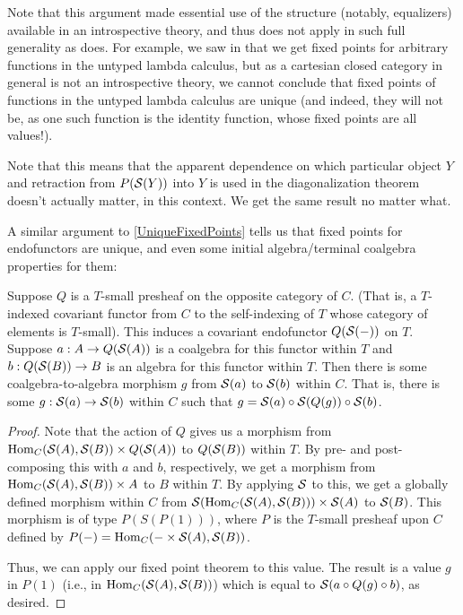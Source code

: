 \begin{observation}
Note that this argument made essential use of the structure (notably, equalizers) available in an introspective theory, and thus does not apply in such full generality as  does. For example, we saw in  that we get fixed points for arbitrary functions in the untyped lambda calculus, but as a cartesian closed category in general is not an introspective theory, we cannot conclude that fixed points of functions in the untyped lambda calculus are unique (and indeed, they will not be, as one such function is the identity function, whose fixed points are all values!).
\end{observation}

\begin{observation}
Note that this means that the apparent dependence on which particular object $Y$ and retraction from $P(\mathcal{S}(Y))$ into $Y$ is used in the diagonalization theorem doesn't actually matter, in this context. We get the same result no matter what.
\end{observation}

A similar argument to \cref{UniqueFixedPoints} tells us that fixed points for endofunctors are unique, and even some initial algebra/terminal coalgebra properties for them: \TODO

\begin{theorem}\label{CoalgToAlgExist}
Suppose $Q$ is a $T$-small presheaf on the opposite category of $C$. (That is, a $T$-indexed covariant functor from $C$ to the self-indexing of $T$ whose category of elements is $T$-small). This induces a covariant endofunctor $Q(\mathcal{S}(-))$ on $T$. Suppose $a : A \to Q(\mathcal{S}(A))$ is a coalgebra for this functor within $T$ and $b : Q(\mathcal{S}(B)) \to B$ is an algebra for this functor within $T$. Then there is some coalgebra-to-algebra morphism $g$ from $\mathcal{S}(a)$ to $\mathcal{S}(b)$ within $C$. That is, there is some $g : \mathcal{S}(a) \to \mathcal{S}(b)$ within $C$ such that $g = \mathcal{S}(a) \circ \mathcal{S}(Q(g)) \circ \mathcal{S}(b)$.
\end{theorem}
\begin{proof}
Note that the action of $Q$ gives us a morphism from $\operatorname{Hom}_C(\mathcal{S}(A), \mathcal{S}(B)) \times Q(\mathcal{S}(A))$ to $Q(\mathcal{S}(B))$ within $T$. By pre- and post-composing this with $a$ and $b$, respectively, we get a morphism from $\operatorname{Hom}_C(\mathcal{S}(A), \mathcal{S}(B)) \times A$ to $B$ within $T$. By applying $\mathcal{S}$ to this, we get a globally defined morphism within $C$ from $\mathcal{S}(\operatorname{Hom}_C(\mathcal{S}(A), \mathcal{S}(B))) \times \mathcal{S}(A)$ to $\mathcal{S}(B)$. This morphism is of type $P(S(P(1)))$, where $P$ is the $T$-small presheaf upon $C$ defined by $P(-) = \operatorname{Hom}_C(- \times \mathcal{S}(A), \mathcal{S}(B))$.

Thus, we can apply our fixed point theorem  to this value. The result is a value $g$ in $P(1)$ (i.e., in $\operatorname{Hom}_C(\mathcal{S}(A), \mathcal{S}(B))$) which is equal to $\mathcal{S}(a \circ Q(g) \circ b)$, as desired.

\end{proof}

